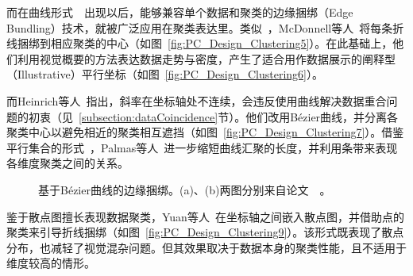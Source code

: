 \documentclass[12pt,twocolumn]{article}
\begin{document}
而在曲线形式~\citep{theisel2000higher}~\citep{graham2003using}出现以后，能够兼容单个数据和聚类的边缘捆绑（Edge Bundling）技术，就被广泛应用在聚类表达里。类似~\citep{zhou2008visual}，McDonnell等人~\citep{mcdonnell2008illustrative}将每条折线捆绑到相应聚类的中心（如图~\ref{fig:PC_Design_Clustering5}）。在此基础上，他们利用视觉概要的方法表达数据走势与密度，产生了适合用作数据展示的阐释型（Illustrative）平行坐标（如图~\ref{fig:PC_Design_Clustering6}）。

而Heinrich等人~\citep{heinrich2011evaluation}指出，斜率在坐标轴处不连续，会违反使用曲线解决数据重合问题的初衷（见~\ref{subsection:dataCoincidence}节）。他们改用B\'ezier曲线，并分离各聚类中心以避免相近的聚类相互遮挡（如图~\ref{fig:PC_Design_Clustering7}）。借鉴平行集合的形式~\citep{kosara2006parallel}，Palmas等人~\citep{palmas2014edge}进一步缩短曲线汇聚的长度，并利用条带来表现各维度聚类之间的关系。

\begin{figure}[!htb]
\centering
{}
\caption{基于B\'ezier曲线的边缘捆绑。(a)、(b)两图分别来自论文~\citep{heinrich2011evaluation}~\citep{palmas2014edge}。}
\end{figure}

鉴于散点图擅长表现数据聚类，Yuan等人~\citep{yuan2009scattering}在坐标轴之间嵌入散点图，并借助点的聚类来引导折线捆绑（如图~\ref{fig:PC_Design_Clustering9}）。该形式既表现了散点分布，也减轻了视觉混杂问题。但其效果取决于数据本身的聚类性能，且不适用于维度较高的情形。
\end{document}
